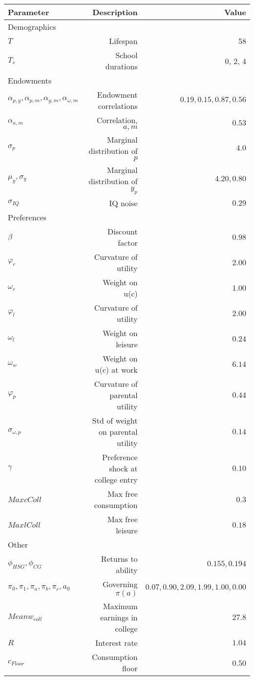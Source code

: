 \begin{tabular}{lrr}
\hline
Parameter & Description  & Value  \\
\hline
Demographics &   &   \\
$T$ & Lifespan  & 58  \\
$T_{s}$ & School durations  & 0, 2, 4  \\
Endowments &   &   \\
$\alpha_{p,y}, \alpha_{p,m}, \alpha_{y,m}, \alpha_{\omega,m}$ & Endowment correlations  & $0.19, 0.15, 0.87, 0.56$  \\
$\alpha_{a,m}$ & Correlation, $a,m$  & $0.53$  \\
$\sigma_{p}$ & Marginal distribution of $p$  & $4.0$  \\
$\mu_{y}, \sigma_{y}$ & Marginal distribution of $y_{p}$  & $4.20, 0.80$  \\
$\sigma_{IQ}$ & IQ noise  & $0.29$  \\
Preferences &   &   \\
$\beta$ & Discount factor  & $0.98$  \\
$\varphi_{c}$ & Curvature of utility  & $2.00$  \\
$\omega_{c}$ & Weight on u(c)  & $1.00$  \\
$\varphi_{l}$ & Curvature of utility  & $2.00$  \\
$\omega_{l}$ & Weight on leisure  & $0.24$  \\
$\omega_{w}$ & Weight on u(c) at work  & $6.14$  \\
$\varphi_{p}$ & Curvature of parental utility  & $0.44$  \\
$\sigma_{\omega,p}$ & Std of weight on parental utility  & $0.14$  \\
$\gamma$ & Preference shock at college entry  & $0.10$  \\
$Max cColl$ & Max free consumption  & $0.3$  \\
$Max lColl$ & Max free leisure  & $0.18$  \\
Other &   &   \\
$\phi_{HSG}, \phi_{CG}$ & Returns to ability  & $0.155, 0.194$  \\
$\pi_{0}, \pi_{1}, \pi_{a}, \pi_{b}, \pi_{c}, a_{0}$ & Governing $\pi(a)$  & $0.07, 0.90, 2.09, 1.99, 1.00, 0.00$  \\
$Mean w_{coll}$ & Maximum earnings in college  & $27.8$  \\
$R$ & Interest rate  & $1.04$  \\
$c_{Floor}$ & Consumption floor  & 0.50  \\
\hline
\end{tabular}%
